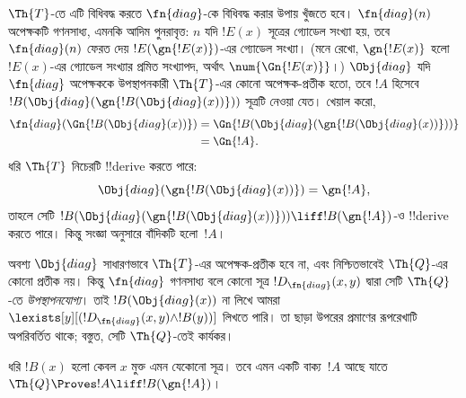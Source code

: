 \documentclass[../../../include/open-logic-section]{subfiles}
\begin{document}
\begin{explain}
$\Th{T}$-তে এটি বিধিবদ্ধ করতে $\fn{diag}$-কে বিধিবদ্ধ করার উপায় খুঁজতে
হবে। $\fn{diag}(n)$ অপেক্ষকটি গণনসাধ্য, এমনকি আদিম পুনরাবৃত্ত: $n$ যদি
$!E(x)$ সূত্রের গ্যোডেল সংখ্যা হয়, তবে $\fn{diag}(n)$ ফেরত দেয়
$!E(\gn{!E(x)})$-এর গ্যোডেল সংখ্যা। (মনে রেখো, $\gn{!E(x)}$ হলো
$!E(x)$-এর গ্যোডেল সংখ্যার প্রমিত সংখ্যাপদ, অর্থাৎ
$\num{\Gn{!E(x)}}$।) $\Obj{diag}$ যদি $\fn{diag}$ অপেক্ষককে
উপস্থাপনকারী $\Th{T}$-এর কোনো অপেক্ষক-প্রতীক হতো, তবে $!A$ হিসেবে
$!B(\Obj{diag}(\gn{!B(\Obj{diag}(x))}))$ সূত্রটি নেওয়া যেত। খেয়াল করো,
\begin{align*}
\fn{diag}(\Gn{!B(\Obj{diag}(x))}) & =
\Gn{!B(\Obj{diag}(\gn{!B(\Obj{diag}(x))}))} \\
& = \Gn{!A}.
\end{align*}
ধরি $\Th{T}$ নিচেরটি !!{derive} করতে পারে:
\[
\Obj{diag}(\gn{!B(\Obj{diag}(x))}) = \gn{!A},
\]
তাহলে সেটি $!B(\Obj{diag}(\gn{!B(\Obj{diag}(x))}))
\liff !B(\gn{!A})$-ও !!{derive} করতে পারে। কিন্তু সংজ্ঞা অনুসারে বাঁদিকটি
হলো~$!A$।

অবশ্য $\Obj{diag}$ সাধারণভাবে $\Th{T}$-এর অপেক্ষক-প্রতীক হবে না, এবং
নিশ্চিতভাবেই $\Th{Q}$-এর কোনো প্রতীক নয়। কিন্তু $\fn{diag}$ গণনসাধ্য
বলে কোনো সূত্র $!D_{\fn{diag}}(x,y)$ দ্বারা সেটি $\Th{Q}$-তে
\emph{উপস্থাপনযোগ্য}। তাই $!B(\Obj{diag}(x))$ না লিখে আমরা
$\lexists[y][(!D_{\fn{diag}}(x,y) \land !B(y))]$ লিখতে পারি। তা ছাড়া
উপরের প্রমাণের রূপরেখাটি অপরিবর্তিত থাকে; বস্তুত, সেটি $\Th{Q}$-তেই
কার্যকর।
\end{explain}

\begin{lem}
 ধরি $!B(x)$ হলো কেবল $x$ মুক্ত এমন যেকোনো
সূত্র। তবে এমন একটি বাক্য~$!A$ আছে যাতে $\Th{Q} \Proves
!A \liff !B(\gn{!A})$।
\end{lem}
\end{document}
